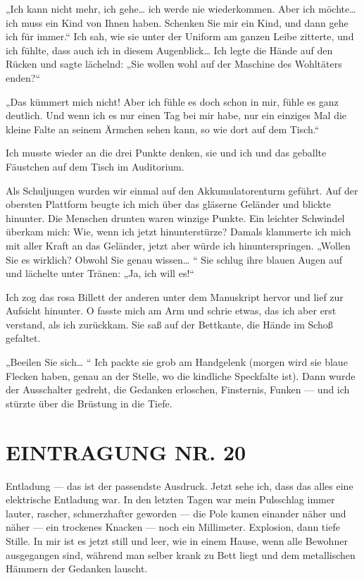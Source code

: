 „Ich kann nicht mehr, ich gehe\ldots{} ich werde nie wiederkommen. Aber
ich möchte\ldots{} ich muss ein Kind von Ihnen haben. Schenken Sie mir
ein Kind, und dann gehe ich für immer.“ Ich sah, wie sie unter der
Uniform am ganzen Leibe
zitterte, und ich fühlte, dass auch ich in diesem Augenblick\ldots{} Ich
legte die Hände auf den Rücken und sagte lächelnd: „Sie wollen wohl
auf der Maschine des Wohltäters enden?“

„Das kümmert mich nicht! Aber ich fühle es doch schon in mir, fühle
es ganz deutlich. Und wenn ich es nur einen Tag bei mir habe, nur
ein einziges Mal die kleine Falte an seinem Ärmchen sehen kann, so
wie dort auf dem Tisch.“

Ich musste wieder an die drei Punkte denken, sie und ich und das
geballte Fäustchen auf dem Tisch im Auditorium.

Als Schuljungen wurden wir einmal auf den Akkumulatorenturm
geführt. Auf der obersten Plattform beugte ich mich über das
gläserne Geländer und blickte hinunter. Die Menschen drunten waren
winzige Punkte. Ein leichter Schwindel überkam mich: Wie, wenn ich
jetzt hinunterstürze? Damals klammerte ich mich mit aller Kraft an
das Geländer, jetzt aber würde ich hinunterspringen. „Wollen Sie es
wirklich? Obwohl Sie genau wissen\ldots{} “ Sie schlug ihre blauen Augen
auf und lächelte unter Tränen: „Ja, ich will es!“

Ich zog das rosa Billett der anderen unter dem Manuskript hervor
und lief zur Aufsicht hinunter. O fasste mich am Arm und schrie
etwas, das ich aber erst verstand, als ich zurückkam. Sie saß auf
der Bettkante, die Hände im Schoß gefaltet.

„Beeilen Sie sich\ldots{} “ Ich packte sie grob am Handgelenk (morgen
wird sie blaue Flecken haben, genau an der Stelle, wo die kindliche
Speckfalte ist). Dann wurde der Ausschalter gedreht, die Gedanken
erloschen, Finsternis, Funken — und ich stürzte über die Brüstung
in die Tiefe.

\section{EINTRAGUNG NR. 20}

Entladung — das ist der passendste Ausdruck. Jetzt sehe ich, dass
das alles eine elektrische Entladung war. In den letzten Tagen war
mein Pulsschlag immer lauter, rascher, schmerzhafter geworden — die
Pole kamen einander näher und näher — ein trockenes Knacken — noch
ein Millimeter. Explosion, dann tiefe Stille. In mir ist es jetzt
still und leer, wie in einem Hause, wenn alle Bewohner ausgegangen
sind, während man selber krank zu Bett liegt und dem metallischen
Hämmern der Gedanken lauscht.

